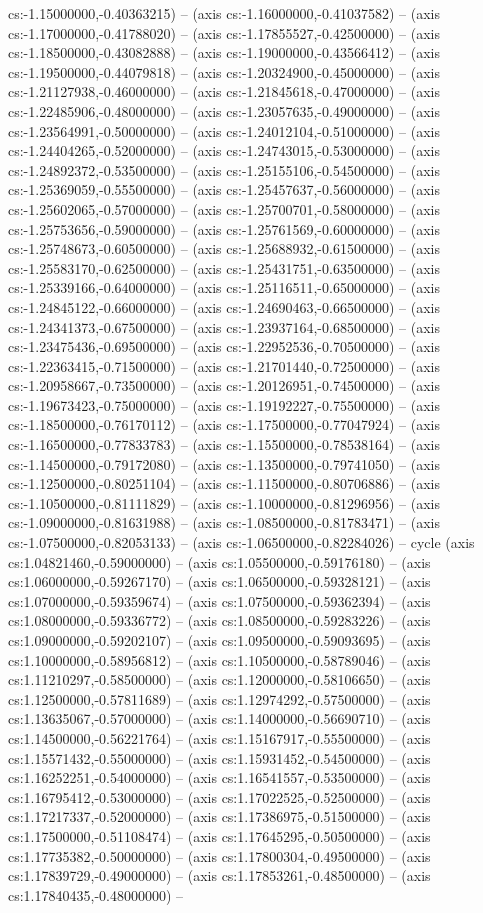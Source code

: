 cs:-1.15000000,-0.40363215) -- (axis cs:-1.16000000,-0.41037582) -- (axis cs:-1.17000000,-0.41788020) -- (axis cs:-1.17855527,-0.42500000) -- (axis cs:-1.18500000,-0.43082888) -- (axis cs:-1.19000000,-0.43566412) -- (axis cs:-1.19500000,-0.44079818) -- (axis cs:-1.20324900,-0.45000000) -- (axis cs:-1.21127938,-0.46000000) -- (axis cs:-1.21845618,-0.47000000) -- (axis cs:-1.22485906,-0.48000000) -- (axis cs:-1.23057635,-0.49000000) -- (axis cs:-1.23564991,-0.50000000) -- (axis cs:-1.24012104,-0.51000000) -- (axis cs:-1.24404265,-0.52000000) -- (axis cs:-1.24743015,-0.53000000) -- (axis cs:-1.24892372,-0.53500000) -- (axis cs:-1.25155106,-0.54500000) -- (axis cs:-1.25369059,-0.55500000) -- (axis cs:-1.25457637,-0.56000000) -- (axis cs:-1.25602065,-0.57000000) -- (axis cs:-1.25700701,-0.58000000) -- (axis cs:-1.25753656,-0.59000000) -- (axis cs:-1.25761569,-0.60000000) -- (axis cs:-1.25748673,-0.60500000) -- (axis cs:-1.25688932,-0.61500000) -- (axis cs:-1.25583170,-0.62500000) -- (axis cs:-1.25431751,-0.63500000) -- (axis cs:-1.25339166,-0.64000000) -- (axis cs:-1.25116511,-0.65000000) -- (axis cs:-1.24845122,-0.66000000) -- (axis cs:-1.24690463,-0.66500000) -- (axis cs:-1.24341373,-0.67500000) -- (axis cs:-1.23937164,-0.68500000) -- (axis cs:-1.23475436,-0.69500000) -- (axis cs:-1.22952536,-0.70500000) -- (axis cs:-1.22363415,-0.71500000) -- (axis cs:-1.21701440,-0.72500000) -- (axis cs:-1.20958667,-0.73500000) -- (axis cs:-1.20126951,-0.74500000) -- (axis cs:-1.19673423,-0.75000000) -- (axis cs:-1.19192227,-0.75500000) -- (axis cs:-1.18500000,-0.76170112) -- (axis cs:-1.17500000,-0.77047924) -- (axis cs:-1.16500000,-0.77833783) -- (axis cs:-1.15500000,-0.78538164) -- (axis cs:-1.14500000,-0.79172080) -- (axis cs:-1.13500000,-0.79741050) -- (axis cs:-1.12500000,-0.80251104) -- (axis cs:-1.11500000,-0.80706886) -- (axis cs:-1.10500000,-0.81111829) -- (axis cs:-1.10000000,-0.81296956) -- (axis cs:-1.09000000,-0.81631988) -- (axis cs:-1.08500000,-0.81783471) -- (axis cs:-1.07500000,-0.82053133) -- (axis cs:-1.06500000,-0.82284026) -- cycle (axis cs:1.04821460,-0.59000000) -- (axis cs:1.05500000,-0.59176180) -- (axis cs:1.06000000,-0.59267170) -- (axis cs:1.06500000,-0.59328121) -- (axis cs:1.07000000,-0.59359674) -- (axis cs:1.07500000,-0.59362394) -- (axis cs:1.08000000,-0.59336772) -- (axis cs:1.08500000,-0.59283226) -- (axis cs:1.09000000,-0.59202107) -- (axis cs:1.09500000,-0.59093695) -- (axis cs:1.10000000,-0.58956812) -- (axis cs:1.10500000,-0.58789046) -- (axis cs:1.11210297,-0.58500000) -- (axis cs:1.12000000,-0.58106650) -- (axis cs:1.12500000,-0.57811689) -- (axis cs:1.12974292,-0.57500000) -- (axis cs:1.13635067,-0.57000000) -- (axis cs:1.14000000,-0.56690710) -- (axis cs:1.14500000,-0.56221764) -- (axis cs:1.15167917,-0.55500000) -- (axis cs:1.15571432,-0.55000000) -- (axis cs:1.15931452,-0.54500000) -- (axis cs:1.16252251,-0.54000000) -- (axis cs:1.16541557,-0.53500000) -- (axis cs:1.16795412,-0.53000000) -- (axis cs:1.17022525,-0.52500000) -- (axis cs:1.17217337,-0.52000000) -- (axis cs:1.17386975,-0.51500000) -- (axis cs:1.17500000,-0.51108474) -- (axis cs:1.17645295,-0.50500000) -- (axis cs:1.17735382,-0.50000000) -- (axis cs:1.17800304,-0.49500000) -- (axis cs:1.17839729,-0.49000000) -- (axis cs:1.17853261,-0.48500000) -- (axis cs:1.17840435,-0.48000000) -- 